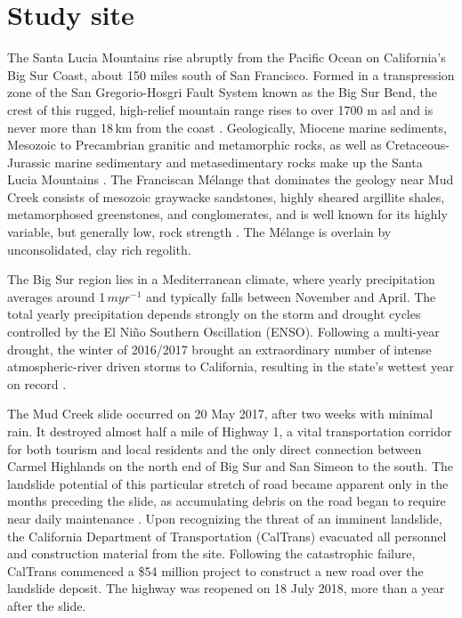 \documentclass[journal abbreviation, manuscript]{copernicus}
\begin{document}
\section{Study site}
The Santa Lucia Mountains rise abruptly from the Pacific Ocean on California's Big Sur Coast, about 150 miles south of San Francisco. Formed in a transpression zone of the San Gregorio-Hosgri Fault System known as the Big Sur Bend, the crest of this rugged, high-relief mountain range rises to over 1700 m asl and is never more than 18\,km from the coast \citep{Johnson2018}. Geologically, Miocene marine sediments,  Mesozoic to Precambrian granitic and metamorphic rocks, as well as Cretaceous-Jurassic marine sedimentary and metasedimentary rocks make up the Santa Lucia Mountains \citep{Graham1978}. The Franciscan Mélange that dominates the geology near Mud Creek consists of mesozoic graywacke sandstones, highly sheared argillite shales, metamorphosed greenstones, and conglomerates, and is well known for its highly variable, but generally low, rock strength \citep{Medley2011, cgs2020}. The Mélange is overlain by unconsolidated, clay rich regolith. \par 
The Big Sur region lies in a Mediterranean climate, where yearly precipitation averages around 1\,$m yr^{-1}$ and typically falls between November and April. The total yearly precipitation depends strongly on the storm and drought cycles controlled by the El Niño Southern Oscillation (ENSO). Following a multi-year drought, the winter of 2016/2017 brought an extraordinary number of intense atmospheric-river driven storms to California, resulting in the state's wettest year on record \citep{swain2018}. 
\par The Mud Creek slide occurred on 20 May 2017, after two weeks with minimal rain. It destroyed almost half a mile of Highway 1, a vital transportation corridor for both tourism and local residents and the only direct connection between Carmel Highlands on the north end of Big Sur and San Simeon to the south. The landslide potential of this particular stretch of road became apparent only in the months preceding the slide, as accumulating debris on the road began to require near daily maintenance \citep{Warrick2019}. Upon recognizing the threat of an imminent landslide, the California Department of Transportation (CalTrans) evacuated all personnel and construction material from the site. Following the catastrophic failure, CalTrans commenced a \$54 million project to construct a new road over the landslide deposit. The highway was reopened on 18 July 2018, more than a year after the slide.\par
\end{document}
